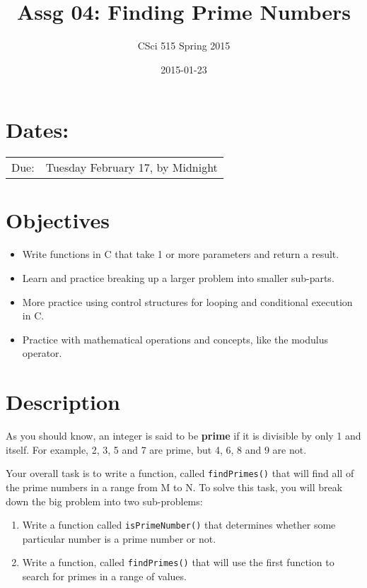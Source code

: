 \documentclass[11pt]{article}
\title{Assg 04: Finding Prime Numbers}
\author{CSci 515 Spring 2015}
\date{2015-01-23}
\begin{document}
\maketitle


\section*{Dates:}
\label{sec-1}


\begin{center}
\begin{tabular}{ll}
 Due:  &  Tuesday February 17, by Midnight  \\
\end{tabular}
\end{center}
\section*{Objectives}
\label{sec-2}

\begin{itemize}
\item Write functions in C that take 1 or more parameters and return a result.
\item Learn and practice breaking up a larger problem into smaller sub-parts.
\item More practice using control structures for looping and conditional
  execution in C.
\item Practice with mathematical operations and concepts, like the modulus
  operator.
\end{itemize}
\section*{Description}
\label{sec-3}

As you should know, an integer is said to be \textbf{prime} if it is
divisible by only 1 and itself.  For example, 2, 3, 5 and 7 are
prime, but 4, 6, 8 and 9 are not.

Your overall task is to write a function, called \verb~findPrimes()~ that
will find all of the prime numbers in a range from M to N.  To
solve this task, you will break down the big problem into two
sub-problems:

\begin{enumerate}
\item Write a function called \verb~isPrimeNumber()~ that determines whether
   some particular number is a prime number or not.
\item Write a function, called \verb~findPrimes()~ that will use the first
   function to search for primes in a range of values.
\end{enumerate}
\end{document}
